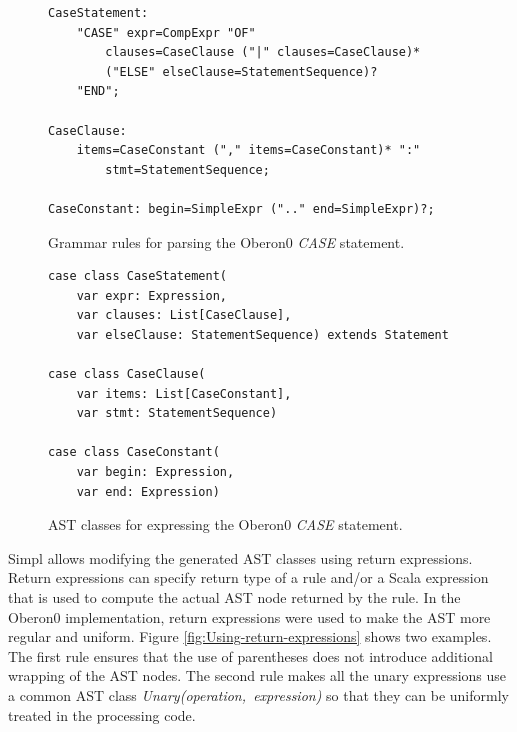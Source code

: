 %
\begin{figure}[!h]
{\small }
\begin{lstlisting}[basicstyle={\footnotesize\ttfamily}]
CaseStatement:
    "CASE" expr=CompExpr "OF"
        clauses=CaseClause ("|" clauses=CaseClause)*
        ("ELSE" elseClause=StatementSequence)?
    "END";

CaseClause:
    items=CaseConstant ("," items=CaseConstant)* ":"
        stmt=StatementSequence;

CaseConstant: begin=SimpleExpr (".." end=SimpleExpr)?;
\end{lstlisting}
{\small \par}

\caption{\label{fig:case-statement}Grammar rules for parsing the Oberon0 \emph{CASE}
statement.}

\end{figure}


%
\begin{figure}[!h]
{\small }
\begin{lstlisting}[basicstyle={\footnotesize\ttfamily}]
case class CaseStatement(
    var expr: Expression, 
    var clauses: List[CaseClause], 
    var elseClause: StatementSequence) extends Statement

case class CaseClause(
    var items: List[CaseConstant],
    var stmt: StatementSequence)

case class CaseConstant(
    var begin: Expression, 
    var end: Expression)
\end{lstlisting}
{\small \par}

\caption{\label{fig:Automatically-generated-AST}AST classes for expressing
the Oberon0 \emph{CASE }statement.}

\end{figure}


Simpl allows modifying the generated AST classes using return expressions.
Return expressions can specify return type of a rule and/or a Scala
expression that is used to compute the actual AST node returned by
the rule. In the Oberon0 implementation, return expressions were used
to make the AST more regular and uniform. Figure \ref{fig:Using-return-expressions}
shows two examples. The first rule ensures that the use of parentheses
does not introduce additional wrapping of the AST nodes. The second
rule makes all the unary expressions use a common AST class \emph{Unary(operation,~expression)}
so that they can be uniformly treated in the processing code. 

